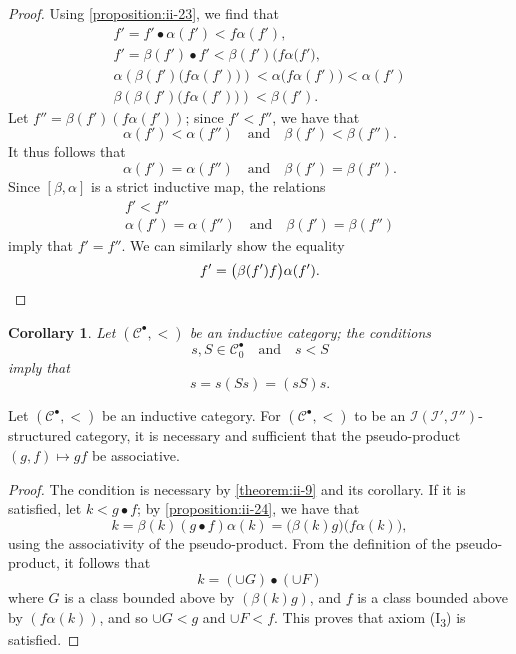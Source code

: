 \documentclass[a4paper,fleqn]{article}
\theoremstyle{plain}
\newenvironment{proposition}[1]
  {\renewcommand\theinnerproposition{#1}\innerproposition}
  {\endinnerproposition}
\newtheorem*{corollary*}{Corollary}
\theoremstyle{definition}
\newcommand{\oldpage}[1]{{\marginpar{\footnotesize$\bigg\vert$\,\,\,\,\textit{p.~#1}}}}
\newcommand{\textand}{\quad\text{and}\quad}
\newcommand{\CC}{\mathcal{C}}
\newcommand{\II}{\mathcal{I}}
\newcommand{\smallbullet}{\bullet}
\begin{document}
\begin{proof}
  Using \cref{proposition:ii-23}, we find that
  \[
    \begin{gathered}
      f'
      = f'\smallbullet\alpha(f')
      < f\alpha(f'),
    \\f'
      = \beta(f')\smallbullet f'
      < \beta(f')\big(f\alpha(f'\big),
    \\\alpha\left(\beta(f')\big(f\alpha(f')\big)\right)
      < \alpha\big(f\alpha(f')\big)
      < \alpha(f')
    \\\beta\left(\beta(f')\big(f\alpha(f')\big)\right)
      < \beta(f').
    \end{gathered}
  \]
  Let $f''=\beta(f')(f\alpha(f'))$;
  since $f'<f''$, we have that
  \[
    \alpha(f')<\alpha(f'')
    \textand
    \beta(f')<\beta(f'').
  \]
  It thus follows that
  \[
    \alpha(f')=\alpha(f'')
    \textand
    \beta(f')=\beta(f'').
  \]
  Since $[\beta,\alpha]$ is a strict inductive map, the relations
  \[
    \begin{gathered}
      f'<f''
    \\\alpha(f')=\alpha(f'')
      \textand
      \beta(f')=\beta(f'')
    \end{gathered}
  \]
  \oldpage{407}
  imply that $f'=f''$.
  We can similarly show the equality
  \[
    f'
    = \big(\beta(f')f\big)\alpha(f').
    \qedhere
  \]
\end{proof}

\begin{corollary*}
  Let $(\CC^\smallbullet,<)$ be an inductive category;
  the conditions
  \[
    s,S\in\CC_0^\smallbullet
    \textand
    s<S
  \]
  imply that
  \[
    s
    = s(Ss)
    = (sS)s.
  \]
\end{corollary*}

\begin{proposition}{25}
\label{proposition:ii-25}
  Let $(\CC^\smallbullet,<)$ be an inductive category.
  For $(\CC^\smallbullet,<)$ to be an $\II(\II',\II'')$-structured category, it is necessary and sufficient that the pseudo-product $(g,f)\mapsto gf$ be associative.
\end{proposition}

\begin{proof}
  The condition is necessary by \cref{theorem:ii-9} and its corollary.
  If it is satisfied, let $k<g\smallbullet f$;
  by \cref{proposition:ii-24}, we have that
  \[
    k
    = \beta(k)(g\smallbullet f)\alpha(k)
    = \big(\beta(k)g\big)\big(f\alpha(k)\big),
  \]
  using the associativity of the pseudo-product.
  From the definition of the pseudo-product, it follows that
  \[
    k
    = (\cup G)\smallbullet(\cup F)
  \]
  where $G$ is a class bounded above by $(\beta(k)g)$, and $f$ is a class bounded above by $(f\alpha(k))$, and so $\cup G<g$ and $\cup F<f$.
  This proves that axiom (I\textquotesingle\!\textsubscript{3}) is satisfied.
\end{proof}
\end{document}
